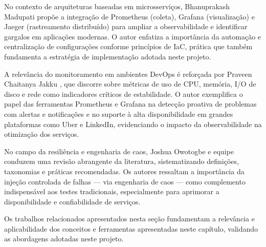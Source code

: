 No contexto de arquiteturas baseadas em microsserviços, Bhanuprakash Madupati \citep{madupati2023} propõe a integração de Prometheus (coleta), Grafana (visualização) e Jaeger (rastreamento distribuído) para ampliar a observabilidade e identificar gargalos em aplicações modernas. O autor enfatiza a importância da automação e centralização de configurações conforme princípios de IaC, prática que também fundamenta a estratégia de implementação adotada neste projeto.

A relevância do monitoramento em ambientes DevOps é reforçada por Praveen Chaitanya Jakku \citep{jakku2025}, que discorre sobre métricas de uso de CPU, memória, I/O de disco e rede como indicadores críticos de estabilidade. O autor exemplifica o papel das ferramentas Prometheus e Grafana na detecção proativa de problemas com alertas e notificações e no suporte à alta disponibilidade em grandes plataformas como Uber e LinkedIn, evidenciando o impacto da observabilidade na otimização dos serviços.

No campo da resiliência e engenharia de caos, Joshua Owotogbe e equipe \citep{chaosengineering2025} conduzem uma revisão abrangente da literatura, sistematizando definições, taxonomias e práticas recomendadas. Os autores ressaltam a importância da injeção controlada de falhas — via engenharia de caos — como complemento indispensável aos testes tradicionais, especialmente para aprimorar a disponibilidade e confiabilidade de serviços.

Os trabalhos relacionados apresentados nesta seção fundamentam a relevância e aplicabilidade dos conceitos e ferramentas apresentadas neste capítulo, validando as abordagens adotadas neste projeto.
